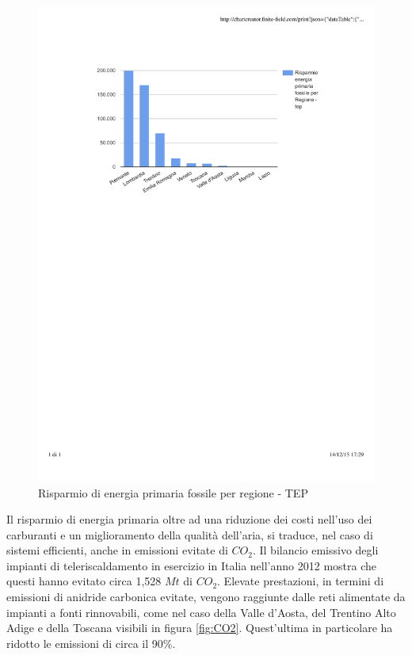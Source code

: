 \documentclass[laurea,oneside,11pt]{USiena_tesiLM}
\begin{document}
\begin{figure}[!ht]
\centering
\includegraphics[width=\textwidth]{figure/tep} 
\caption{Risparmio di energia primaria fossile per regione - TEP}
\label{fig:tep}
\end{figure}

Il risparmio di energia primaria oltre ad una riduzione dei costi nell'uso dei carburanti e un miglioramento della qualità dell'aria, si traduce, nel caso di sistemi efficienti, anche in emissioni evitate di $CO_2$.
Il bilancio emissivo degli impianti di teleriscaldamento in esercizio in Italia nell'anno 2012 mostra che questi hanno evitato circa 1,528 $Mt$ di $CO_2$.
Elevate prestazioni, in termini di emissioni di anidride carbonica evitate, vengono raggiunte dalle reti alimentate da impianti a fonti rinnovabili, come nel caso della Valle d'Aosta, del Trentino Alto Adige e della Toscana visibili in figura \ref{fig:CO2}. Quest'ultima in particolare ha ridotto le emissioni di circa il 90\%.
\end{document}
